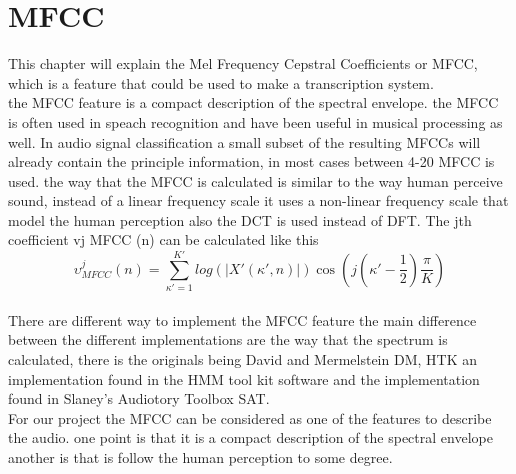 \section{MFCC}
This chapter will explain the Mel Frequency Cepstral Coefficients or MFCC, which is a feature that could be used to make a transcription system. \\
the MFCC feature is a compact description of the spectral envelope. the MFCC is often used in speach recognition and have been useful in musical processing as well\citep{ACA}. In audio signal classification a small subset of the resulting MFCCs will already contain the principle information, in most cases between 4-20 MFCC is used. the way that the MFCC is calculated is  similar to the way human perceive sound, instead of a linear frequency scale it uses a non-linear frequency scale that model the human perception also the DCT is used instead of DFT\citep{ACA}. The jth coefficient 
vj MFCC (n) can be calculated like this\citep{ACA}\\
\begin{equation}\label{ eq:MFCC calculation}
	 \upsilon ^j  _{MFCC} (n) = \sum_{\kappa'=1}^{K'} log(\vert X' (\kappa',n) \vert)\cos(j(\kappa' - \frac{1}{2})\frac{\pi}{K})
\end{equation}
\\
There are different way to implement the MFCC feature the main difference between the different implementations are the way that the spectrum is calculated, there is the originals being David and Mermelstein DM, HTK an implementation found in the HMM tool kit software and the implementation found in Slaney's Audiotory Toolbox SAT\citep{Slaney}.
\\
For our project the MFCC can be considered as one of the features to describe the audio. one point is that it is a compact description of the spectral envelope another is that is follow the human perception to some degree.